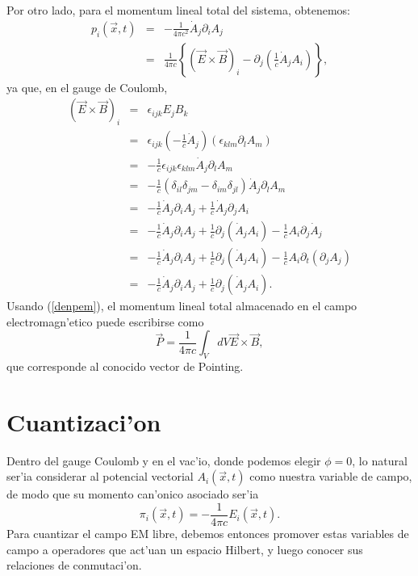 Por otro lado, para el momentum lineal total del sistema, obtenemos:
\begin{eqnarray}
p_{i}(\vec{x},t)& = &-\frac{1}{4\pi c^{2}}\dot{A}_{j}\partial_{i}A_{j}\\
& = &\frac{1}{4\pi c}\left\{ \left( \vec{E}\times\vec{B}\right) _{i}%
-\partial_{j}\left(\frac{1}{c} \dot{A}_{j}A_{i}\right) \right\}, \label{denpem}
\end{eqnarray}
ya que, en el gauge de Coulomb,
\begin{eqnarray}
\left( \vec{E}\times\vec{B}\right) _{i} & = &\epsilon_{ijk}E_{j}B_{k}\\
& = &\epsilon_{ijk}\left( -\frac{1}{c}\dot{A}_{j}\right) \left( \epsilon_{klm}%
\partial_{l}A_{m}\right) \\
& = &-\frac{1}{c}\epsilon_{ijk}\epsilon_{klm}\dot{A}_{j}\partial_{l}A_{m}\\
& = &-\frac{1}{c}\left( \delta_{il}\delta_{jm}-\delta_{im}\delta_{jl}\right)
\dot{A}%
_{j}\partial_{l}A_{m}\\
& =
&-\frac{1}{c}\dot{A}_{j}\partial_{i}A_{j}+\frac{1}{c}\dot{A}_{j}\partial_{j}A_{i
}\\
& = &-\frac{1}{c}\dot{A}_{j}\partial_{i}A_{j}+\frac{1}{c}\partial_{j}\left(
\dot{A}_{j}A_{i}\right)
-\frac{1}{c}A_{i}\partial_{j}\dot{A}_{j}\\
& = &-\frac{1}{c}\dot{A}_{j}\partial_{i}A_{j}+\frac{1}{c}\partial_{j}\left(
\dot{A}_{j}A_{i}\right)
-\frac{1}{c}A_{i}\partial_{t}\left( \partial_{j}A_{j}\right)\\
& = &-\frac{1}{c}\dot{A}_{j}\partial_{i}A_{j}+\frac{1}{c}\partial_{j}\left(
\dot{A}_{j}A_{i}\right).
\end{eqnarray}
Usando (\ref{denpem}), el momentum lineal total almacenado en el campo
electromagn'etico puede escribirse como
\begin{equation}
\vec{P}=\frac{1}{4\pi c}\int_{V}dV \vec{E}\times\vec{B} ,\label{Momentum Lineal
Total EM2}%
\end{equation} 
que corresponde al conocido vector de Pointing.


\section{Cuantizaci'on}

Dentro del gauge Coulomb y en el vac'io, donde podemos elegir $\phi=0$, lo
natural ser'ia considerar al potencial vectorial $A_i(\vec{x},t) $ como nuestra
variable de campo, de modo que su momento can'onico asociado ser'ia
\begin{equation}
\pi_i(\vec{x},t) =-\frac{1}{4\pi c}E_i(\vec{x},t).
\end{equation}
Para cuantizar el campo EM libre, debemos entonces promover estas variables de
campo a operadores que act'uan un espacio Hilbert, y luego conocer sus
relaciones de conmutaci'on.

